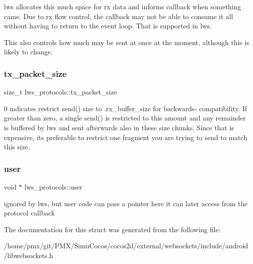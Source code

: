 lws allocates this much space for rx data and informs callback when something came. Due to rx flow control, the callback may not be able to consume it all without having to return to the event loop. That is supported in lws.

This also controls how much may be sent at once at the moment, although this is likely to change. \mbox{\label{structlws__protocols_aa18feb18890dd1faab944ac92cae9187}} 
\subsubsection{\texorpdfstring{tx\+\_\+packet\+\_\+size}{tx\_packet\_size}}
{\footnotesize\ttfamily size\+\_\+t lws\+\_\+protocols\+::tx\+\_\+packet\+\_\+size}

0 indicates restrict send() size to .rx\+\_\+buffer\+\_\+size for backwards-\/ compatibility. If greater than zero, a single send() is restricted to this amount and any remainder is buffered by lws and sent afterwards also in these size chunks. Since that is expensive, it\textquotesingle{}s preferable to restrict one fragment you are trying to send to match this size. \mbox{\label{structlws__protocols_aa952f56d53a0f261e486507b59e433ec}} 
\subsubsection{\texorpdfstring{user}{user}}
{\footnotesize\ttfamily void $\ast$ lws\+\_\+protocols\+::user}

ignored by lws, but user code can pass a pointer here it can later access from the protocol callback 

The documentation for this struct was generated from the following file\+:\begin{DoxyCompactItemize}
\item 
/home/pmx/git/\+P\+M\+X/\+Simu\+Cocos/cocos2d/external/websockets/include/android/libwebsockets.\+h\end{DoxyCompactItemize}

